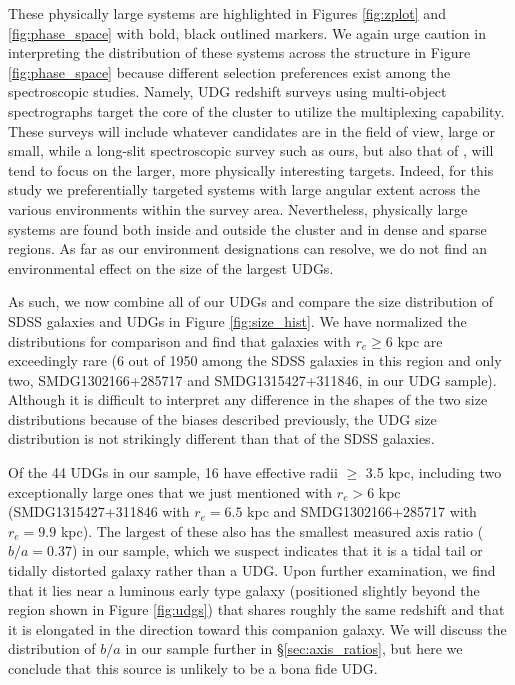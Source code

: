 \documentclass[twocolumn,tighten]{aastex63}
\begin{document}
These physically large systems are highlighted in Figures \ref{fig:zplot} and \ref{fig:phase_space} with bold, black outlined markers. We again urge caution in interpreting the distribution of these systems across the structure in Figure \ref{fig:phase_space} because different selection preferences exist among the spectroscopic studies. Namely, UDG redshift surveys using multi-object spectrographs target the core of the cluster to utilize the multiplexing capability. These surveys will include whatever candidates are in the field of view, large or small, while a long-slit spectroscopic survey such as ours, but also that of \cite{vanDokkum2015b}, will tend to focus on the larger, more physically interesting targets. Indeed, for this study we preferentially targeted systems with large angular extent across the various environments within the survey area. Nevertheless, 
physically large systems are found both inside and outside the cluster and in dense and sparse regions. As far as our environment designations can resolve, we do not find an environmental effect on the size of the largest UDGs.

As such, we now combine all of our UDGs and compare the size distribution of SDSS galaxies and UDGs in 
Figure \ref{fig:size_hist}. We have normalized the distributions for comparison and find that galaxies with $r_e \geq 6$ kpc are exceedingly rare (6 out of 1950 among the SDSS galaxies in this region and only two, SMDG1302166+285717 and SMDG1315427+311846, in our UDG sample). Although it is difficult to interpret any difference in the shapes of the two size distributions because of the biases described previously, the UDG size distribution is not strikingly different than that of the SDSS galaxies. 

Of the 44 UDGs in our sample, 16 have effective radii $\ge$ 3.5 kpc, including two exceptionally large ones that we just mentioned with $r_e > 6$ kpc (SMDG1315427+311846 with $r_e = 6.5$ kpc and SMDG1302166+285717 with $r_e = 9.9$ kpc).
The largest of these also has the smallest measured axis ratio ($b/a=0.37$) in our sample, which we suspect indicates that it is a tidal tail or tidally distorted galaxy rather than a UDG. 
Upon further examination, we find that it lies near a luminous early type galaxy (positioned slightly beyond the region shown in Figure \ref{fig:udgs}) that shares roughly the same redshift and that it is elongated in the direction toward this companion galaxy.
We will discuss the distribution of $b/a$ in our sample further in \S\ref{sec:axis_ratios}, but here we conclude that this source is unlikely to be a bona fide UDG. 
\end{document}
